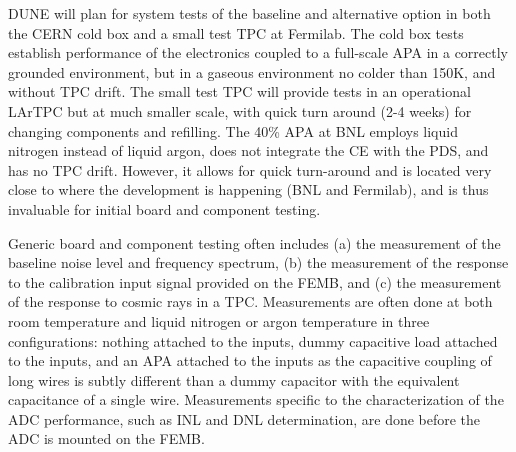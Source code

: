 DUNE will plan for system tests of the baseline and alternative option in both the CERN cold box and a small test TPC at Fermilab.  The cold box tests establish performance of the electronics coupled to a full-scale APA in a correctly grounded environment, but in a gaseous environment no colder than 150K, and without TPC drift.  The small test TPC will provide tests in an operational LArTPC but at much smaller scale, with quick turn around (2-4 weeks) for changing components and refilling.  The 40\% APA at BNL employs liquid nitrogen instead of liquid argon, does not integrate the CE with the PDS, and has no TPC drift.  However, it allows for quick turn-around and is located very close to where the development is happening (BNL and Fermilab), and is thus invaluable for initial board and component testing.

Generic board and component testing often includes (a) the measurement of the baseline noise level and frequency spectrum, (b) the measurement of the response to the calibration input signal provided on the FEMB, and (c) the measurement of the response to cosmic rays in a TPC.  Measurements are often done at both room temperature and liquid nitrogen or argon temperature in three configurations: nothing attached to the inputs, dummy capacitive load attached to the inputs, and an APA attached to the inputs as the capacitive coupling of long wires is subtly different than a dummy capacitor with the equivalent capacitance of a single wire.  Measurements specific to the characterization of the ADC performance, such as INL and DNL determination, are done before the ADC is mounted on the FEMB.
